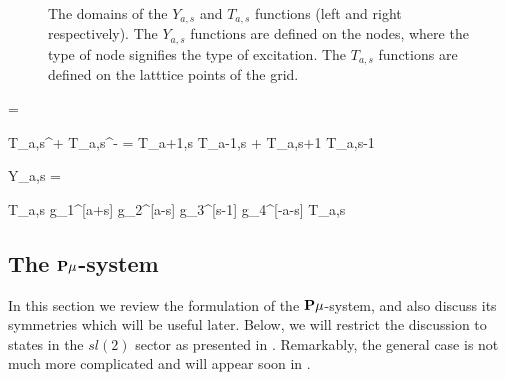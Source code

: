 \begin{figure}[t]
\label{fig:yt_hooks}
\caption{The domains of the $Y_{a,s}$ and $T_{a,s}$ functions (left and right respectively). The $Y_{a,s}$ functions are defined on the nodes, where the type of node signifies the type of excitation. The $T_{a,s}$ functions are defined on the latttice points of the grid.}
\end{figure}

\beq
	 = 
\eeq



\beq
	T_{a,s}^+ T_{a,s}^- = T_{a+1,s} T_{a-1,s} + T_{a,s+1} T_{a,s-1} 
\eeq

\beq
	Y_{a,s} = 
\eeq

\beq
	T_{a,s} \rightarrow g_1^{[a+s]} g_2^{[a-s]} g_3^{[s-1]} g_4^{[-a-s]} \; T_{a,s}
\eeq




\subsection{The ${\bf P}\mu$-system}


In this section we review the formulation of the ${\bf P}\mu$-system, and also discuss its symmetries which will be useful later.
Below, we will restrict the discussion to states in the $sl(2)$ sector as presented in \cite{PmuPRL}.
Remarkably, the general case is not much more complicated and will appear soon in \cite{PmuLong}.


